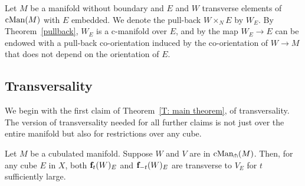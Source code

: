 \begin{definition}
	Let $M$ be a manifold without boundary and $E$ and $W$ transverse elements of $\mathrm{cMan}(M)$ with $E$ embedded.
	We denote the pull-back $W \times_N E$ by $W_E$. By Theorem~\ref{pullback}, $W_E$ is a c-manifold over $E$, and by \cite{FMS-foundations} the map $W_E\to E$ can be endowed with a pull-back co-orientation induced by the co-orientation of $W\to M$ that does not depend on the orientation of $E$.
\end{definition}

\subsection{Transversality}

We begin with the first claim of Theorem~\ref{T: main theorem}, of transversality. The version of transversality needed for all further claims
is not just over the entire manifold but also for restrictions over any cube.

\begin{theorem}\label{T: transversality}
	Let $M$ be a cubulated manifold.
	Suppose $W$ and $V$ are in $\mathrm{cMan}_\pitchfork(M)$.
	Then, for any cube $E$ in $X$, both $\mathbf{f}_t(W)_E$ and $\mathbf{f}_{-t}(W)_E$ are transverse to $V_E$ for $t$ sufficiently large.
\end{theorem}


